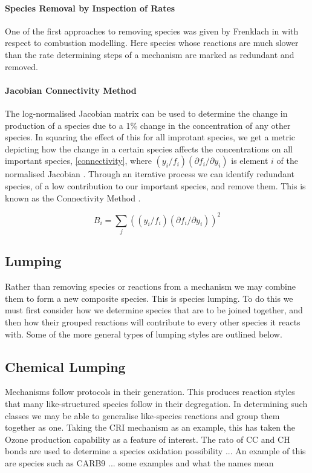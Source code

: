\paragraph*{Species Removal by Inspection of Rates}
One of the first approaches to removing species was given by Frenklach in \cite{frenk} with respect to combustion modelling. Here species whose reactions are much slower than the rate determining steps of a mechanism are marked as redundant and removed. 

\paragraph*{Jacobian Connectivity Method}

The log-normalised Jacobian matrix can be used to determine the change in production of a species due to a 1\% change in the concentration of any other species. In squaring the effect of this for all improtant species, we get a metric depicting how the change in a certain species affects the concentrations on all important species, \autoref{connectivity}, where $({y_i}/{f_i})({\partial f_i}/{\partial y_i})$ is element $i$ of the normalised Jacobian . Through an iterative process we can identify redundant species, of a low contribution to our important species, and remove them. This is known as the Connectivity Method \cite{cm}.


\begin{equation}
B_i  = \sum_j(({y_i}/{f_i})({\partial f_i}/{\partial y_i}))^2 \label{connectivity}
\end{equation}

\subsection{Lumping}
Rather than removing species or reactions from a mechanism we may combine them to form a new composite species. This is species lumping. To do this we must first consider how we determine species that are to be joined together, and then how their grouped reactions will contribute to every other species it reacts with. Some of the more general types of lumping styles are outlined below. 


\subsection{Chemical Lumping}
Mechanisms follow protocols in their generation. This produces reaction styles that many like-structured species follow in their degregation. In determining such classes we may be able to generalise like-species reactions and group them together as one. Taking the CRI mechanism as an example, this has taken the Ozone production capability as a feature of interest. The rato of CC and CH bonds are used to determine a species oxidation possibility ... An example of this are species such as CARB9  ... some examples and what the names mean \\

